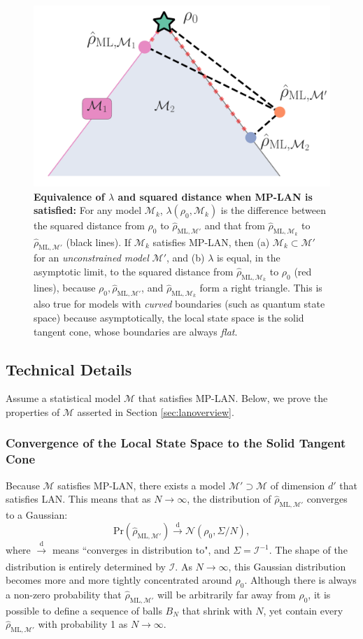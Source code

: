 \documentclass[aps,pra, twocolumn]{revtex4-1}
\newcommand{\M}{\mathcal{M}}
\newcommand{\rhohat}{\hat{\rho}}
\newcommand{\rhoML}[1]{\rhohat_{\scriptscriptstyle{\mathrm{ML},#1}}}
\begin{document}
\begin{figure}
\includegraphics[width=.75\columnwidth]{Images/Figure_3.pdf}
 \caption{\textbf{Equivalence of $\lambda$ and squared distance when MP-LAN is satisfied:} For any model $\M_{k}$, $\lambda(\rho_{0}, \M_{k})$ is the difference between the squared distance from $\rho_{0}$ to $\rhoML{\M'}$ and that from $\rhoML{\M_{k}}$ to $\rhoML{\M'}$ (black lines). If $\M_{k}$ satisfies MP-LAN, then (a) $\M_{k} \subset \M'$ for an \emph{unconstrained model} $\M'$, and (b) $\lambda$ is equal, in the asymptotic limit, to the squared distance from $\rhoML{\M_{k}}$ to $\rho_{0}$ (red lines), because $\rho_{0}, \rhoML{\M'}$, and $\rhoML{\M_{k}}$ form a right triangle. This is also true for models with \emph{curved} boundaries (such as quantum state space) because asymptotically, the local state space is the solid tangent cone, whose boundaries are always \emph{flat}.}
\label{fig:llrs_MP-LAN}
\end{figure}

\subsection{Technical Details}

Assume a statistical model $\M$ that satisfies MP-LAN. Below, we prove the properties of $\M$ asserted in Section \ref{sec:lanoverview}. 

\subsubsection{Convergence of the Local State Space to the Solid Tangent Cone}

Because $\M$ satisfies MP-LAN, there exists a model $\M' \supset \M$ of dimension $d'$ that satisfies LAN. This means that as $N \rightarrow \infty$, the distribution of $\rhoML{\M'}$ converges to a Gaussian:
\[\mathrm{Pr}(\rhoML{\M'})\xrightarrow[]{\text{d}} \mathcal{N}(\rho_{0}, \Sigma/N),\]
where $\xrightarrow[]{\text{d}}$ means ``converges in distribution to", and $\Sigma = \mathcal{I}^{-1}$.
The shape of the distribution is entirely determined by $\mathcal{I}$. As $N \rightarrow \infty$, this Gaussian distribution becomes more and more tightly concentrated around $\rho_{0}$. Although there is always a non-zero probability that $\rhoML{\M'}$ will be arbitrarily far away from $\rho_{0}$, it is possible to define a sequence of balls $B_{N}$ that shrink with $N$, yet contain every $\rhoML{\M'}$ with probability 1 as $N \rightarrow \infty$.
\end{document}
